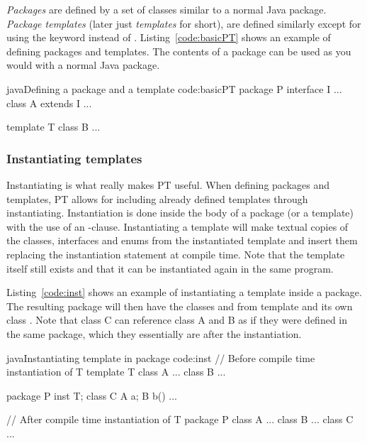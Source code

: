 \emph{Packages} are defined by a set of classes similar to a normal Java package.
\emph{Package templates} (later just \emph{templates} for short), are defined similarly except for using the keyword  instead of .
Listing~\vref{code:basicPT} shows an example of defining packages and templates.
The contents of a package can be used as you would with a normal Java package.

\begin{code}{java}{Defining a package  and a template }{code:basicPT}
    package P {
        interface I { ... }
        class A extends I { ... }
    }

    template T {
        class B { ... }
    }
\end{code}

\subsubsection{Instantiating templates}\label{subsubsec:inst}
Instantiating is what really makes PT useful.
When defining packages and templates, PT allows for including already defined templates through instantiating.
Instantiation is done inside the body of a package (or a template) with the use of an -clause.
Instantiating a template will make textual copies of the  classes, interfaces and enums from the instantiated template and insert them replacing the instantiation statement at compile time.
Note that the template itself still exists and that it can be instantiated again in the same program.

Listing~\vref{code:inst} shows an example of instantiating a template inside a package.
The resulting package  will then have the classes  and  from template  and its own class .
Note that class C can reference class A and B as if they were defined in the same package, which they essentially are after the instantiation.

\begin{code}{java}{Instantiating template  in package }{code:inst}
// Before compile time instantiation of T
template T {
    class A { ... }
    class B { ... }
}

package P {
    inst T;
    class C {
        A a;
        B b() {
            ...
        }
    }
}

// After compile time instantiation of T
package P {
    class A { ... }
    class B { ... }
    class C { ... }
}
\end{code}

